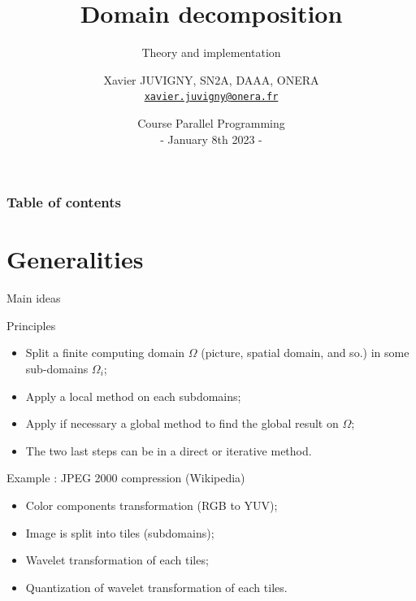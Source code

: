 \documentclass[compress,10pt,aspectratio=169]{beamer}
\title[Parallel programming\hspace{2em}]{Domain decomposition}
\subtitle{Theory and implementation}
\author[X. JUVIGNY]{Xavier JUVIGNY, SN2A, DAAA, ONERA\\ \href{mailto:xavier.juvigny@onera.fr}{\texttt{xavier.juvigny@onera.fr}} }
\date[01/08/2023]{Course Parallel Programming\\- January 8th 2023 -}
\institute{\inst{1}ONERA,\inst{2}DAAA}
\begin{document}
\MakeTitlePage

\begin{frame}
\frametitle{Table of contents}
\begin{multicols}{2}
\tableofcontents[hideallsubsections]
\end{multicols}
\end{frame}

\section{Generalities}

\begin{frame}[fragile]{Main ideas}
    \scriptsize

    \begin{block}{\small Principles}
        \begin{itemize}
            \item Split a finite computing domain $\Omega$ (picture, spatial domain, and so.) in some sub-domains $\Omega_{i}$;
            \item Apply a local method on each subdomains;
            \item Apply if necessary a global method to find the global result on $\Omega$;
            \item The two last steps can be in a direct or iterative method.
        \end{itemize}
    \end{block}

    \begin{exampleblock}{\small Example : JPEG 2000 compression (Wikipedia)}
        \begin{itemize}
            \item Color components transformation (RGB to YUV);
            \item Image is split into tiles (subdomains);
            \item Wavelet transformation of each tiles;
            \item Quantization of wavelet transformation of each tiles.
        \end{itemize}
    \end{exampleblock}
\end{frame}
\end{document}
